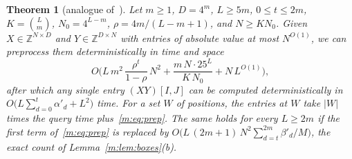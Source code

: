 \documentclass[11pt]{article}
\newtheorem{theorem}{Theorem}[section]
\theoremstyle{definition}
\theoremstyle{remark}
\newcommand{\Z}{\mathbb{Z}}
\newcommand{\Nz}{N_0}
\begin{document}
\begin{theorem}[analogue of~{\cite[Theorem 30]{ZT}}]\label{m:thm:tech}
Let $m\ge1$, $D=4^m$, $L\ge5m$, $0\le t\le2m$, $K=\binom Lm$, $\Nz=4^{L-m}$, $\rho=4m/(L-m+1)$, and $N\ge K\Nz$. Given $X\in\Z^{N\times D}$ and $Y\in\Z^{D\times N}$ with entries of absolute value at most $N^{O(1)}$, we can preprocess them deterministically in time and space
\begin{equation}\label{m:eq:prep}
O\Big(L\,m^2\,\frac{\rho^t}{1-\rho}\,N^2+\frac{m\,N\cdot25^L}{K\,\Nz}+N\,L^{O(1)}\Big),
\end{equation}
after which any single entry $(XY)[I,J]$ can be computed deterministically in $O\big(L\sum_{d=0}^{t}\alpha'_d+L^2\big)$ time. For a set $W$ of positions, the entries at $W$ take $|W|$ times the query time plus~\eqref{m:eq:prep}. The same holds for every $L\ge2m$ if the first term of~\eqref{m:eq:prep} is replaced by $O\big(L\,(2m+1)\,N^2\sum_{d=t}^{2m}\beta'_d/M\big)$, the exact count of Lemma~\ref{m:lem:boxes}(b).
\end{theorem}
\end{document}
